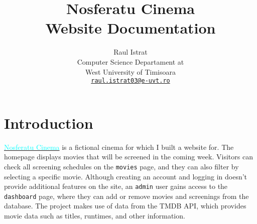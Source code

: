 \documentclass[a4paper]{article}
\title{Nosferatu Cinema\\Website Documentation}
\author{Raul Istrat\\
Computer Science Departament at\\
West University of Timisoara\\
\href{mailto:raul.istrat03@e-uvt.ro}{\texttt{raul.istrat03@e-uvt.ro}}}
\date{}
\begin{document}
\raggedright
\maketitle
\tableofcontents

\section*{Introduction}
    \href{https://github.com/domnu-raul/nosferatu-cinema/}{\textcolor{cyan}{Nosferatu Cinema}} is a fictional cinema for which I built a website for. The homepage displays movies that will be screened in the coming week. Visitors can check all screening schedules on the \texttt{movies} page, and they can also filter by selecting a specific movie. Although creating an account and logging in doesn't provide additional features on the site, an \texttt{admin} user gains access to the \texttt{dashboard} page, where they can add or remove movies and screenings from the database. The project makes use of data from the TMDB API, which provides movie data such as titles, runtimes, and other information.
\end{document}
